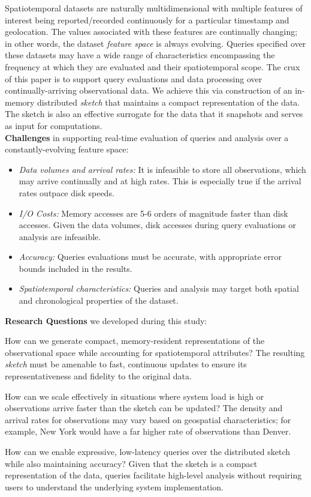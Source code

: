 \documentclass[9pt,journal,compsoc]{IEEEtran}
\begin{document}
Spatiotemporal datasets are naturally multidimensional with multiple features of interest being reported/recorded continuously for a particular timestamp and geolocation. The values associated with these features are continually changing; in other words, the dataset \emph{feature space} is always evolving.  Queries specified over these datasets may have a wide range of characteristics encompassing the frequency at which they are evaluated and their spatiotemporal scope. The crux of this paper is to support query evaluations and data processing over continually-arriving observational data. We achieve this via construction of an in-memory distributed \emph{sketch} that maintains a compact representation of the data.
The sketch is also an effective surrogate for the data that it snapshots and serves as input for computations.
%
%
\vspace{1.7em}\\
%
\textbf{Challenges} in supporting real-time evaluation of queries and analysis over a constantly-evolving feature space:
\begin{itemize}[leftmargin=*]
    \item   \emph{Data volumes and arrival rates:} It is infeasible to store all observations, which may arrive continually and at high rates. This is especially true if the arrival rates outpace disk speeds.
    \item \emph{I/O Costs:} Memory accesses are 5-6 orders of magnitude faster than disk accesses. Given the data volumes, disk accesses during query evaluations or analysis are infeasible.
    \item   \emph{Accuracy:} Queries evaluations must be accurate, with appropriate error bounds included in the results.
    \item   \emph{Spatiotemporal characteristics:} Queries and analysis may target both spatial and chronological properties of the dataset.
\end{itemize}
%
\vspace{0.7em}
%
\textbf{Research Questions} we developed during this study:
\begin{description}[leftmargin=*]
    \item[\emph{RQ-1:}] How can we generate compact, memory-resident representations of the observational space while accounting for spatiotemporal attributes? The resulting \emph{sketch} must be amenable to fast, continuous updates to ensure its representativeness and fidelity to the original data.
    \item[\emph{RQ-2:}] How can we scale effectively in situations where system load is high or observations arrive faster than the sketch can be updated? The density and arrival rates for observations may vary based on geospatial characteristics; for example, New York would have a far higher rate of observations than Denver.
    \item[\emph{RQ-3:}] How can we enable expressive, low-latency queries over the distributed sketch while also maintaining accuracy?  Given that the sketch is a compact representation of the data, queries facilitate high-level analysis without requiring users to understand the underlying system implementation.
\end{description}
\end{document}
